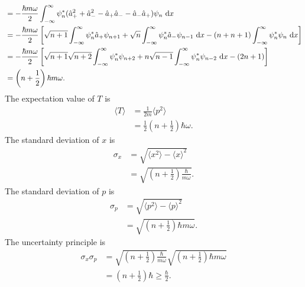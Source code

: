 \documentclass[en, oneside]{vivi}
\begin{document}
\begin{sol}
\begin{align*}
        &= - \frac{\hbar m \omega}{2} \int_{-\infty}^{\infty} \psi_n^* (\hat a_+^2 + \hat a_-^2 - \hat a_+ \hat a_- - \hat a_- \hat a_+) \psi_n \dif x\\
        &= - \frac{\hbar m \omega}{2} \left[ \sqrt{n+1} \int_{-\infty}^{\infty} \psi_n^* \hat a_+ \psi_{n+1} + \sqrt{n} \int_{-\infty}^{\infty} \psi_n^* \hat a_- \psi_{n-1} \dif x - (n+n+1)\int_{-\infty}^{\infty} \psi_n^* \psi_n \dif x \right]\\
        &= - \frac{\hbar m \omega}{2} \left[ \sqrt{n+1} \sqrt{n+2} \int_{-\infty}^{\infty} \psi_n^* \psi_{n+2} + n \sqrt{n-1} \int_{-\infty}^{\infty} \psi_n^* \psi_{n-2} \dif x - (2n+1) \right]\\
        &= \left( n+\frac{1}{2} \right) \hbar m \omega.
    \end{align*}
    The expectation value of $T$ is
    \begin{align*}
        \langle T \rangle &= \frac{1}{2m} \langle p^2 \rangle\\
        &= \frac{1}{2} \left( n+\frac{1}{2} \right) \hbar \omega.
    \end{align*}
    The standard deviation of $x$ is
    \begin{align*}
        \sigma_x &= \sqrt{\langle x^2 \rangle - \langle x \rangle^2}\\
        &= \sqrt{\left( n+\frac{1}{2} \right) \frac{\hbar}{m\omega}}.
    \end{align*}
    The standard deviation of $p$ is
    \begin{align*}
        \sigma_p &= \sqrt{\langle p^2 \rangle - \langle p \rangle^2}\\
        &= \sqrt{\left( n+\frac{1}{2} \right) \hbar m \omega}.
    \end{align*}
    The uncertainty principle is
    \begin{align*}
        \sigma_x \sigma_p &= \sqrt{\left( n+\frac{1}{2} \right) \frac{\hbar}{m\omega}} \sqrt{\left( n+\frac{1}{2} \right) \hbar m \omega}\\
        &= \left( n+\frac{1}{2} \right) \hbar \geq \frac{\hbar}{2}.
    \end{align*}
\end{sol}
\end{document}
